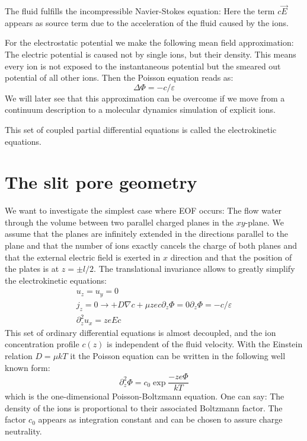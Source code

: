 The fluid fulfills the incompressible Navier-Stokes equation:
Here the term $c \vec{E}$ appears as source term due
to the acceleration of the fluid caused by the ions. 

For the electrostatic potential we make the following
mean field approximation: The electric potential is 
caused not by single ions, but their density. This means
every ion is not exposed to the instantaneous potential
but the smeared out potential of all other ions. Then the Poisson
equation reads as:
\begin{equation}
  \Delta \Phi = -c/\varepsilon
  \label{asdf}
\end{equation}
We will later
see that this approximation can be overcome if we move
from a continuum description to a molecular dynamics simulation
of explicit ions.

This set of coupled partial differential equations is called
the electrokinetic equations. 

\section{The slit pore geometry}
We want to investigate the simplest case where EOF occurs:
The flow water through the volume between two parallel
charged planes in the $xy$-plane. We assume that the planes are infinitely
extended in the directions parallel to the plane and that
the number of ions exactly cancels the charge of both planes
and that the external electric field is exerted in $x$ direction
and that the position of the plates is at $z=\pm l/2$.
The translational invariance allows to greatly simplify the
electrokinetic equations:
\begin{eqnarray}
  u_z = u_y = 0 \\
  j_z = 0 \rightarrow +D \nabla c + \mu ze c \partial_z \Phi = 0
  \partial_z \Phi = -c/\varepsilon \\
  \partial_z^2 u_x = zeEc
  \label{EOF}
\end{eqnarray}
This set of ordinary differential equations is almost decoupled, 
and the ion concentration profile $c\left(z\right)$ is independent
of the fluid velocity. With the Einstein relation $D=\mu kT$ it the
Poisson equation can be written in the following well known form:
\begin{equation}
  \partial_z^2 \Phi = c_0 \exp{\frac{-ze\Phi}{kT}}
\end{equation}
which is the one-dimensional Poisson-Boltzmann equation. One can say:
The density of the ions is proportional to their associated
Boltzmann factor. The factor $c_0$ appears as integration constant
and can be chosen to assure charge neutrality.

